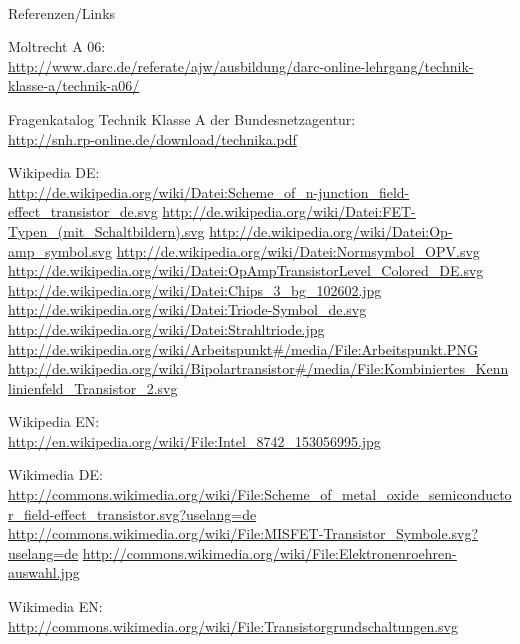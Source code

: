 \renewcommand{\refname}{Referenzen}

\hypertarget{refs}{}
\textcolor{white}{} \\ %
\Large Referenzen/Links
\footnotesize

\begin{thebibliography}{}
       Moltrecht A 06: \\
                    \url{http://www.darc.de/referate/ajw/ausbildung/darc-online-lehrgang/technik-klasse-a/technik-a06/}
                    
		Fragenkatalog Technik Klasse A der Bundesnetzagentur:\\
		\url{http://snh.rp-online.de/download/technika.pdf}                    
                    
        Wikipedia DE: \\
    	\url{http://de.wikipedia.org/wiki/Datei:Scheme_of_n-junction_field-effect_transistor_de.svg}
    	\url{http://de.wikipedia.org/wiki/Datei:FET-Typen_(mit_Schaltbildern).svg}
        \url{http://de.wikipedia.org/wiki/Datei:Op-amp_symbol.svg}
        \url{http://de.wikipedia.org/wiki/Datei:Normsymbol_OPV.svg}      
        \url{http://de.wikipedia.org/wiki/Datei:OpAmpTransistorLevel_Colored_DE.svg}  
        \url{http://de.wikipedia.org/wiki/Datei:Chips_3_bg_102602.jpg}
        \url{http://de.wikipedia.org/wiki/Datei:Triode-Symbol_de.svg}
        \url{http://de.wikipedia.org/wiki/Datei:Strahltriode.jpg}
	\url{http://de.wikipedia.org/wiki/Arbeitspunkt#/media/File:Arbeitspunkt.PNG}
	\url{http://de.wikipedia.org/wiki/Bipolartransistor#/media/File:Kombiniertes_Kennlinienfeld_Transistor_2.svg}
                    
    	Wikipedia EN:\\
    	\url{http://en.wikipedia.org/wiki/File:Intel_8742_153056995.jpg}
    	
    	Wikimedia DE:\\
    	\url{http://commons.wikimedia.org/wiki/File:Scheme_of_metal_oxide_semiconductor_field-effect_transistor.svg?uselang=de}
    	\url{http://commons.wikimedia.org/wiki/File:MISFET-Transistor_Symbole.svg?uselang=de}
    	\url{http://commons.wikimedia.org/wiki/File:Elektronenroehren-auswahl.jpg}
    	
     Wikimedia EN:\\
    	\url{http://commons.wikimedia.org/wiki/File:Transistorgrundschaltungen.svg}\
    				
\end{thebibliography} 


